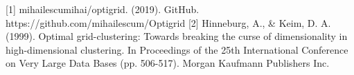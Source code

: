 [1] mihailescumihai/optigrid. (2019). GitHub. https://github.com/mihailescum/Optigrid
[2] Hinneburg, A., \& Keim, D. A. (1999). Optimal grid-clustering: Towards breaking the curse of dimensionality in high-dimensional clustering. In Proceedings of the 25th International Conference on Very Large Data Bases (pp. 506-517). Morgan Kaufmann Publishers Inc.